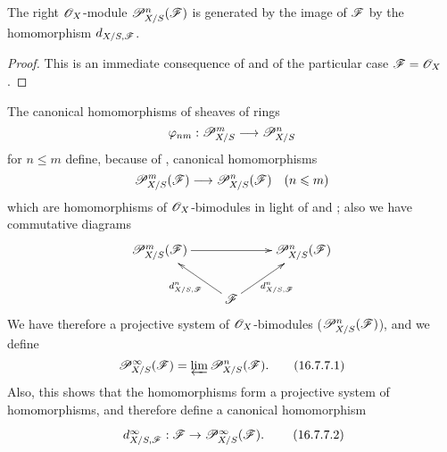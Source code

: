 \begin{proposition}[16.7.6]
\label{IV.16.7.6}
The right $\mathscr{O}_X$-module $\mathscr{P}_{X/S}^n(\mathscr{F})$ is generated by the image of $\mathscr{F}$ by the homomorphism $d_{X/S, \mathscr{F}}$.
\end{proposition}

\begin{proof}
This is an immediate consequence of  and of the particular case $\mathscr{F} = \mathscr{O}_X$ .
\end{proof}

\begin{env}[16.7.7]
\label{IV.16.7.7}
The canonical homomorphisms of sheaves of rings
\[
  \varphi_{nm}:\sh{P}_{X/S}^m \to \sh{P}_{X/S}^n 
\]
for $n \leq m$  define, because of , canonical homomorphisms 
\[
  \sh{P}_{X/S}^m(\sh{F}) \to \sh{P}_{X/S}^n(\sh{F}) \quad (n \leq m)
\]
which are homomorphisms of $\mathscr{O}_X$-bimodules in light of  and ;
also we have commutative diagrams
\[
  \xymatrix{
    \sh{P}_{X/S}^m(\sh{F}) \ar[rr] && \sh{P}_{X/S}^n(\sh{F}) \\
      & \sh{F} \ar[ul]^-{d_{X/S,\sh{F}}^n} \ar[ur]_-{d_{X/S,\sh{F}}^n}
  }
\]
We have therefore a projective system of $\mathscr{O}_X$-bimodules ($\mathscr{P}_{X/S}^n(\mathscr{F})$), and we define
\[
  \label{IV.16.7.7.1}
  \mathscr{P}_{X/S}^\infty(\mathscr{F}) = \varprojlim \mathscr{P}_{X/S}^n(\mathscr{F}).
  \tag{16.7.7.1}
\]
Also, this shows that the homomorphisms  form a projective system of homomorphisms, and therefore define a canonical homomorphism
\[
  \label{IV.16.7.7.2}
  \xymatrix{
    d_{X/S,\sh{F}}^\infty: \sh{F} \to \sh{P}_{X/S}^\infty(\sh{F}).
  }
  \tag{16.7.7.2}
\]
\end{env}


